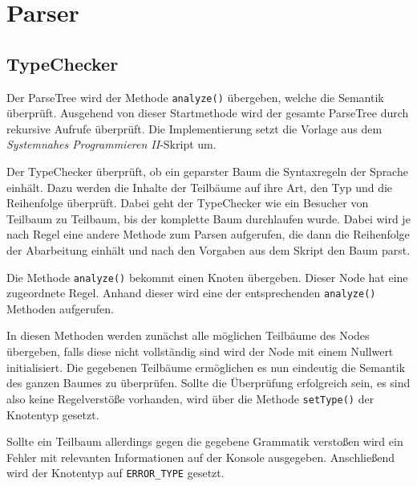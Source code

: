\chapter{Parser}\label{chap:Parser}

\section{TypeChecker}
Der ParseTree wird der Methode \texttt{analyze()} übergeben, welche die Semantik überprüft. Ausgehend von dieser Startmethode wird der gesamte ParseTree durch rekursive Aufrufe überprüft. Die Implementierung setzt die Vorlage aus dem \emph{Systemnahes Programmieren II}-Skript um.

Der TypeChecker überprüft, ob ein geparster Baum die Syntaxregeln der Sprache einhält. Dazu werden die Inhalte der Teilbäume auf ihre Art, den Typ und die Reihenfolge überprüft. Dabei geht der TypeChecker wie ein Besucher von Teilbaum zu Teilbaum, bis der komplette Baum durchlaufen wurde.
Dabei wird je nach Regel eine andere Methode zum Parsen aufgerufen, die dann die Reihenfolge der Abarbeitung einhält und nach den Vorgaben aus dem Skript den Baum parst.

Die Methode \texttt{analyze()} bekommt einen Knoten übergeben. Dieser Node hat eine zugeordnete Regel. Anhand dieser wird eine der entsprechenden \texttt{analyze()} Methoden aufgerufen.

In diesen Methoden werden zunächst alle möglichen Teilbäume des Nodes übergeben, falls diese nicht vollständig sind wird der Node mit einem Nullwert initialisiert.
Die gegebenen Teilbäume ermöglichen es nun eindeutig die Semantik des ganzen Baumes zu überprüfen. Sollte die Überprüfung erfolgreich sein, es sind also keine Regelverstöße vorhanden, wird über die Methode \texttt{setType()} der Knotentyp gesetzt.

Sollte ein Teilbaum allerdings gegen die gegebene Grammatik verstoßen wird ein Fehler mit relevanten Informationen auf der Konsole ausgegeben. Anschließend wird der Knotentyp auf \texttt{ERROR\_TYPE} gesetzt.
